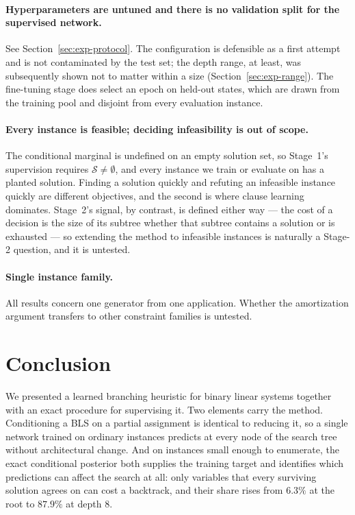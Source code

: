 \documentclass[preprint,12pt]{elsarticle}
\newcommand{\SOL}{\mathcal{S}}
\begin{document}
\paragraph{Hyperparameters are untuned and there is no validation split for the supervised network.} See Section~\ref{sec:exp-protocol}. The configuration is defensible as a first attempt and is not contaminated by the test set; the depth range, at least, was subsequently shown not to matter within a size (Section~\ref{sec:exp-range}). The fine-tuning stage does select an epoch on held-out states, which are drawn from the training pool and disjoint from every evaluation instance.

\paragraph{Every instance is feasible; deciding infeasibility is out of scope.} The conditional marginal is undefined on an empty solution set, so Stage~1's supervision requires $\SOL\neq\emptyset$, and every instance we train or evaluate on has a planted solution. Finding a solution quickly and refuting an infeasible instance quickly are different objectives, and the second is where clause learning dominates. Stage~2's signal, by contrast, is defined either way --- the cost of a decision is the size of its subtree whether that subtree contains a solution or is exhausted --- so extending the method to infeasible instances is naturally a Stage-2 question, and it is untested.

\paragraph{Single instance family.} All results concern one generator from one application. Whether the amortization argument transfers to other constraint families is untested.

\section{Conclusion}
\label{sec:conclusion}

We presented a learned branching heuristic for binary linear systems together with an exact procedure for supervising it. Two elements carry the method. Conditioning a BLS on a partial assignment is identical to reducing it, so a single network trained on ordinary instances predicts at every node of the search tree without architectural change. And on instances small enough to enumerate, the exact conditional posterior both supplies the training target and identifies which predictions can affect the search at all: only variables that every surviving solution agrees on can cost a backtrack, and their share rises from $6.3\%$ at the root to $87.9\%$ at depth $8$.
\end{document}
